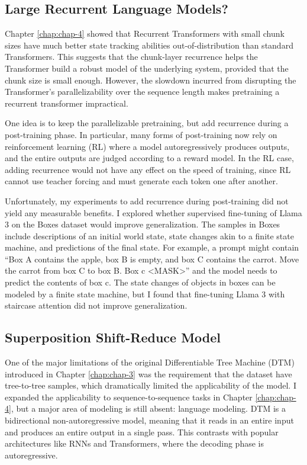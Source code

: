 \subsection{Large Recurrent Language Models?}
Chapter \ref{chap:chap-4} showed that Recurrent Transformers with small chunk sizes have much better state tracking abilities out-of-distribution than standard Transformers. This suggests that the chunk-layer recurrence helps the Transformer build a robust model of the underlying system, provided that the chunk size is small enough. However, the slowdown incurred from disrupting the Transformer's parallelizability over the sequence length makes pretraining a recurrent transformer impractical.

One idea is to keep the parallelizable pretraining, but add recurrence during a post-training phase. In particular, many forms of post-training now rely on reinforcement learning (RL) where a model autoregressively produces outputs, and the entire outputs are judged according to a reward model. In the RL case, adding recurrence would not have any effect on the speed of training, since RL cannot use teacher forcing and must generate each token one after another.

Unfortunately, my experiments to add recurrence during post-training did not yield any measurable benefits. I explored whether supervised fine-tuning of Llama 3 \citep{grattafiori2024llama3herdmodels} on the Boxes dataset \citep{kim-schuster-2023-entity} would improve generalization. The samples in Boxes include descriptions of an initial world state, state changes akin to a finite state machine, and predictions of the final state. For example, a prompt might contain ``Box A contains the apple, box B is empty, and box C contains the carrot. Move the carrot from box C to box B. Box c <MASK>'' and the model needs to predict the contents of box c. The state changes of objects in boxes can be modeled by a finite state machine, but I found that fine-tuning Llama 3 with staircase attention \citep{ju_staircase_2022} did not improve generalization. 


\subsection{Superposition Shift-Reduce Model}
One of the major limitations of the original Differentiable Tree Machine (DTM) introduced in Chapter \ref{chap:chap-3} was the requirement that the dataset have tree-to-tree samples, which dramatically limited the applicability of the model. I expanded the applicability to sequence-to-sequence tasks in Chapter \ref{chap:chap-4}, but a major area of modeling is still absent: language modeling. DTM is a bidirectional non-autoregressive model, meaning that it reads in an entire input and produces an entire output in a single pass. This contrasts with popular architectures like RNNs and Transformers, where the decoding phase is autoregressive.

